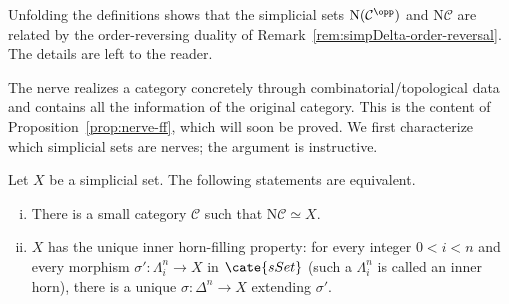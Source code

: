 \begin{remark}
	Unfolding the definitions shows that the simplicial sets
	$\mathrm{N}(\mathcal{C}^{\opp})$ and $\mathrm{N}\mathcal{C}$ are related
	by the order-reversing duality of
	Remark~\ref{rem:simpDelta-order-reversal}. The details are left to the
	reader.
\end{remark}

The nerve realizes a category concretely through combinatorial/topological
data and contains all the information of the original category. This is the
content of Proposition~\ref{prop:nerve-ff}, which will soon be proved. We
first characterize which simplicial sets are nerves; the argument is
instructive.

\begin{proposition}\label{prop:inner-horn-filling}
	Let $X$ be a simplicial set. The following statements are equivalent.
	\begin{enumerate}[(i)]
		\item There is a small category $\mathcal{C}$ such that
		$\mathrm{N}\mathcal{C}\simeq X$.
		\item $X$ has the unique inner horn-filling property: for every integer
		$0<i<n$ and every morphism $\sigma':\Lambda^n_i\to X$ in
		$\cate{sSet}$ (such a $\Lambda^n_i$ is called an inner horn), there is
		a unique $\sigma:\Delta^n\to X$ extending $\sigma'$.
	\end{enumerate}
\end{proposition}
